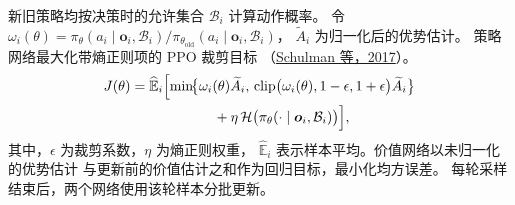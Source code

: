 \documentclass[UTF8,fontset=fandol]{ctexart}
\begin{document}
新旧策略均按决策时的允许集合 \(\mathcal{B}_i\) 计算动作概率。
令 \(\omega_i(\theta)=
\pi_{\theta}(a_i\mid\boldsymbol{o}_i,\mathcal{B}_i)/
\pi_{\theta_{\mathrm{old}}}(a_i\mid\boldsymbol{o}_i,\mathcal{B}_i)\)，
\(\widetilde{A}_i\) 为归一化后的优势估计。
策略网络最大化带熵正则项的 PPO 裁剪目标
（\href{https://arxiv.org/abs/1707.06347}{Schulman 等，2017}）。
\begin{equation}
  \begin{aligned}
    J(\theta)={}&\widehat{\mathbb{E}}_i
      \Bigl[\min\!\bigl\{
      \omega_i(\theta)\widetilde{A}_i,\,
      \operatorname{clip}\bigl(\omega_i(\theta),1-\epsilon,1+\epsilon\bigr)
        \widetilde{A}_i\bigr\}\\
      &\hspace{4.6em}+\eta\,
        \mathcal{H}\bigl(\pi_{\theta}(\cdot\mid\boldsymbol{o}_i,\mathcal{B}_i)\bigr)
      \Bigr],
  \end{aligned}
  \label{eq:masked-ppo-objective}
\end{equation}
其中，\(\epsilon\) 为裁剪系数，\(\eta\) 为熵正则权重，
\(\widehat{\mathbb{E}}_i\) 表示样本平均。价值网络以未归一化的优势估计
与更新前的价值估计之和作为回归目标，最小化均方误差。
每轮采样结束后，两个网络使用该轮样本分批更新。
\end{document}
